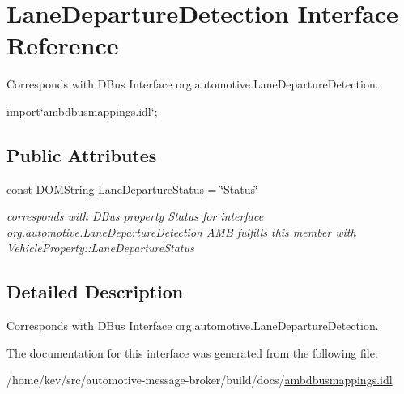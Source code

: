 \hypertarget{interfaceLaneDepartureDetection}{\section{Lane\+Departure\+Detection Interface Reference}
\label{interfaceLaneDepartureDetection}
}


Corresponds with D\+Bus Interface org.\+automotive.\+Lane\+Departure\+Detection.  




{\ttfamily import\char`\"{}ambdbusmappings.\+idl\char`\"{};}

\subsection*{Public Attributes}
\begin{DoxyCompactItemize}
\item 
\hypertarget{interfaceLaneDepartureDetection_a068d5ab2f6d467cffe3ba8a7abe12d44}{const D\+O\+M\+String \hyperlink{interfaceLaneDepartureDetection_a068d5ab2f6d467cffe3ba8a7abe12d44}{Lane\+Departure\+Status} = \char`\"{}Status\char`\"{}}\label{interfaceLaneDepartureDetection_a068d5ab2f6d467cffe3ba8a7abe12d44}

\begin{DoxyCompactList}\small\item\em corresponds with D\+Bus property Status for interface org.\+automotive.\+Lane\+Departure\+Detection A\+M\+B fulfills this member with Vehicle\+Property\+::\+Lane\+Departure\+Status \end{DoxyCompactList}\end{DoxyCompactItemize}


\subsection{Detailed Description}
Corresponds with D\+Bus Interface org.\+automotive.\+Lane\+Departure\+Detection. 

The documentation for this interface was generated from the following file\+:\begin{DoxyCompactItemize}
\item 
/home/kev/src/automotive-\/message-\/broker/build/docs/\hyperlink{ambdbusmappings_8idl}{ambdbusmappings.\+idl}\end{DoxyCompactItemize}
